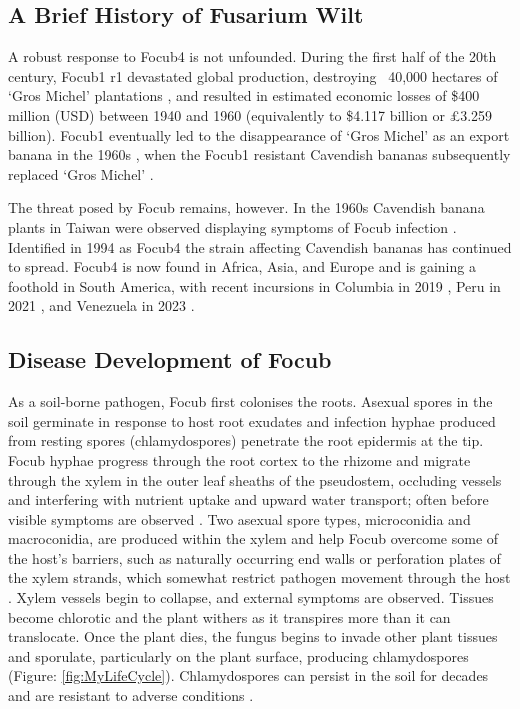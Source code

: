 \subsection{A Brief History of Fusarium Wilt}
\label{chap1:focHistory}
A robust response to \ac{Focub4} is not unfounded. During the first half of the 20th century, \ac{Focub1} \ac{r1} devastated global production, destroying  ~40,000 hectares of ‘Gros Michel’ plantations \parencite{Agrios2005, Kema2021}, and resulted in estimated economic losses of \$400 million (USD) between 1940 and 1960 (equivalently to \$4.117 billion or £3.259 billion)\parencite{Ploetz2005}. \ac{Focub1} eventually led to the disappearance of ‘Gros Michel’ as an export banana in the 1960s \parencite{Molina2007}, when the \ac{Focub1} resistant Cavendish bananas subsequently replaced ‘Gros Michel’ \parencite{Ordonez2015a}. 

The threat posed by \ac{Focub} remains, however. In the 1960s Cavendish banana plants in Taiwan were observed displaying symptoms of \ac{Focub} infection \parencite{Agrios2005}. Identified in 1994 as \acl{Focub4} \parencite{Ploetz1994} the strain affecting Cavendish bananas has continued to spread. \Ac{Focub4} is now found in Africa, Asia, and Europe \parencite{Ploetz2015a, Thangavelu2019} and is gaining a foothold in South America, with recent incursions in Columbia in 2019 \parencite{Garcia-Bastidas2019}, Peru in 2021 \parencite{Acuna2022}, and Venezuela in 2023 \parencite{Herrera2023}.

\subsection{Disease Development of \acl{Focub}}

As a soil-borne pathogen, \ac{Focub} first colonises the roots. Asexual spores in the soil germinate in response to host root exudates and infection hyphae produced from resting spores (chlamydospores) penetrate the root epidermis at the tip. \ac{Focub} hyphae progress through the root cortex to the rhizome and migrate through the xylem in the outer leaf sheaths of the pseudostem, occluding vessels and interfering with nutrient uptake and upward water transport; often before visible symptoms are observed \parencite{Li2017, Warman2018}. Two asexual spore types, microconidia and macroconidia, are produced within the xylem and help \ac{Focub} overcome some of the host’s barriers, such as naturally occurring end walls or perforation plates of the xylem strands, which somewhat restrict pathogen movement through the host \parencite{Dita2018}. Xylem vessels begin to collapse, and external symptoms are observed. Tissues become chlorotic and the plant withers as it transpires more than it can translocate. Once the plant dies, the fungus begins to invade other plant tissues and sporulate, particularly on the plant surface, producing chlamydospores (Figure: \ref{fig:MyLifeCycle}). Chlamydospores can persist in the soil for decades and are resistant to adverse conditions \parencite{Pegg2019}.  

